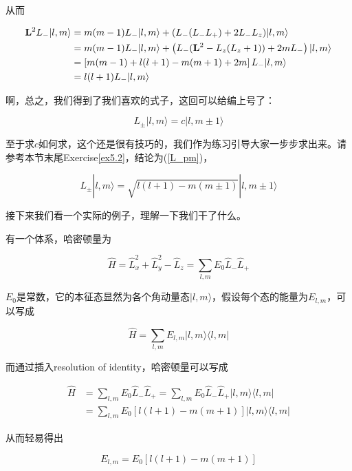 从而

\begin{equation}
\begin{split}
{\bf L}^2L_{-}|l,m\rangle &= m(m-1)L_{-}|l,m\rangle +(L_- (L_-L_+) + 2L_-L_z)|l,m\rangle \\
&= m(m-1)L_{-}|l,m\rangle +\left(L_- ({\bf L}^2 - L_z(L_z+1)) + 2mL_-\right)|l,m\rangle \\
&= \left[m(m-1) + l(l+1) - m(m+1) + 2m\right]L_-|l,m\rangle \\
&= l(l+1)L_-|l,m\rangle
\end{split}
\end{equation}

啊，总之，我们得到了我们喜欢的式子，这回可以给编上号了：

\begin{equation}
L_{\pm}|l,m\rangle = c|l,m\pm1\rangle
\end{equation}

至于求$c$如何求，这个还是很有技巧的，我们作为练习引导大家一步步求出来。请参考本节末尾Exercise{\ref{ex5.2}}，结论为(\ref{L_pm})，

\begin{equation}
L_{\pm}|l,m\rangle = \sqrt{l(l+1) - m(m\pm 1)}|l,m\pm1\rangle
\end{equation}

接下来我们看一个实际的例子，理解一下我们干了什么。

\begin{example}
有一个体系，哈密顿量为

\begin{equation}
\hat H = \hat L_x^2 + \hat L_y^2 -\hat  L_z = \sum_{l,m} E_0 \hat L_-\hat L_+
\end{equation}

$E_0$是常数，它的本征态显然为各个角动量态$|l,m\rangle$，假设每个态的能量为$E_{l,m}$，可以写成

\begin{equation}
\hat H = \sum_{l,m}E_{l,m}|l,m\rangle\langle l,m|
\end{equation}

而通过插入resolution of identity，哈密顿量可以写成

\begin{equation}
\begin{split}
\hat H &= \sum_{l,m} E_0 \hat L_-\hat L_+ = \sum_{l,m} E_0 \hat L_-\hat L_+ |l,m\rangle \langle l,m|\\ &= \sum_{l,m} E_0 \left[l(l+1)-m(m+1)\right]|l,m\rangle \langle l,m|
\end{split}
\end{equation}

从而轻易得出

\begin{equation}
E_{l,m} = E_0 \left[l(l+1)-m(m+1)\right]
\end{equation}

\end{example}

